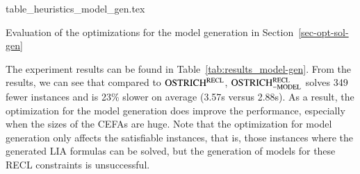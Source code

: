 \begin{table}[htbp]
  \centering
  {table_heuristics_model_gen.tex}
  \caption{Evaluation of the optimizations for the model generation in Section~\ref{sec-opt-sol-gen}}\label{tab:results_model-gen}
\end{table}

The experiment results can be found in Table~\ref{tab:results_model-gen}. From the results, we can see that compared to $\rm OSTRICH^{RECL}$, $\rm OSTRICH^{RECL}_{\rm -MODEL}$ solves 349 fewer instances and is 23\% slower on average (3.57s versus 2.88s). As a result, the optimization for the model generation does improve the performance, especially when the sizes of the CEFAs are huge.  
Note that the optimization for model generation only affects the satisfiable instances, that is, those instances where the generated LIA formulas can be solved, but the generation of models for these RECL constraints is unsuccessful. 


